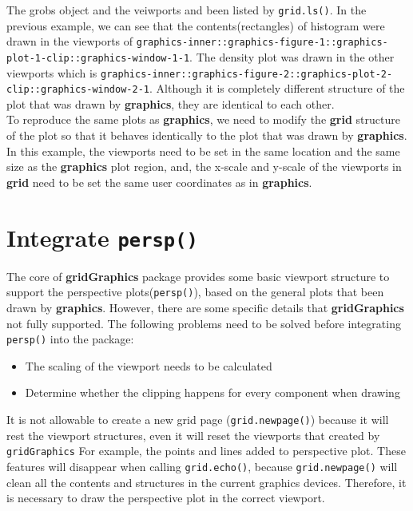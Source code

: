 \documentclass{report}
\begin{document}
The grobs object and the veiwports and been listed by \texttt{grid.ls()}. In the previous example, we can see that the contents(rectangles) of histogram were drawn in the viewports of \texttt{graphics-inner::graphics-figure-1::graphics-plot-1-clip::graphics-window-1-1}. The density plot was drawn in the other viewports which is \texttt{graphics-inner::graphics-figure-2::graphics-plot-2-clip::graphics-window-2-1}. Although it is completely different structure of the plot that was drawn by \textbf{graphics}, they are identical to each other.\\

To reproduce the same plots as \textbf{graphics}, we need to modify the \textbf{grid} structure of the plot so that it behaves identically to the plot that was drawn by \textbf{graphics}. In this example, the viewports need to be set in the same location and the same size as the \textbf{graphics} plot region, and, the x-scale and y-scale of the viewports in \textbf{grid} need to be set the same user coordinates as in \textbf{graphics}.\\

\section{Integrate \texttt{persp()}}
The core of \textbf{gridGraphics} package provides some basic viewport structure to support the perspective plots(\texttt{persp()}), based on the general plots that been drawn by \textbf{graphics}. However, there are some specific details that \textbf{gridGraphics} not fully supported.
The following problems need to be solved before integrating \texttt{persp()} into the package:
\begin{itemize}
	\item{The scaling of the viewport needs to be calculated}
	\item{Determine whether the clipping happens for every component when drawing}
\end{itemize}

It is not allowable to create a new grid page (\texttt{grid.newpage()}) because it will rest the viewport structures, even it will reset the viewports that created by \texttt{gridGraphics}
For example, the points and lines added to perspective plot. These features will disappear when calling \texttt{grid.echo()}, because \texttt{grid.newpage()} will clean all the contents and structures in the current graphics devices. Therefore, it is necessary to draw the perspective plot in the correct viewport.\\
\end{document}
